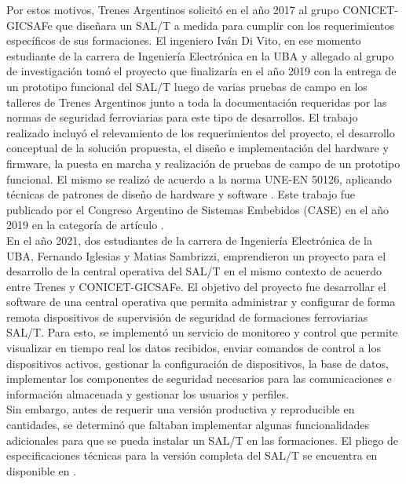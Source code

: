 Por estos motivos, Trenes Argentinos solicitó en el año 2017 al grupo CONICET-GICSAFe que diseñara un SAL/T a medida para cumplir con los requerimientos específicos de sus formaciones. El ingeniero Iván Di Vito, en ese momento estudiante de la carrera de Ingeniería Electrónica en la UBA y allegado al grupo de investigación tomó el proyecto que finalizaría en el año 2019 con la entrega de un prototipo funcional del SAL/T luego de varias pruebas de campo en los talleres de Trenes Argentinos junto a toda la documentación requeridas por las normas de seguridad ferroviarias para este tipo de desarrollos. El trabajo realizado incluyó el relevamiento de los requerimientos del proyecto, el desarrollo conceptual de la solución propuesta, el diseño e implementación del hardware y firmware, la puesta en marcha y realización de pruebas de campo de un prototipo funcional. El mismo se realizó de acuerdo a la norma UNE-EN 50126, aplicando técnicas de patrones de diseño de hardware y software \cite{patrones}. Este trabajo fue publicado por el Congreso Argentino de Sistemas Embebidos (CASE) en el año 2019 en la categoría de artículo \cite{salt_case}. \\

En el año 2021, dos estudiantes de la carrera de Ingeniería Electrónica de la UBA, Fernando Iglesias y Matias Sambrizzi, emprendieron un proyecto para el desarrollo de la central operativa del SAL/T en el mismo contexto  de acuerdo entre Trenes y CONICET-GICSAFe. El objetivo del proyecto fue desarrollar el software de una central operativa que permita administrar y configurar de forma remota dispositivos de supervisión de seguridad de formaciones ferroviarias SAL/T. Para esto, se implementó un servicio de monitoreo y control que permite visualizar en tiempo real los datos recibidos, enviar comandos de control a los dispositivos activos, gestionar la configuración de dispositivos, la base de datos, implementar los componentes de seguridad necesarios para las comunicaciones e información almacenada y gestionar los usuarios y perfiles. \\


Sin embargo, antes de requerir una versión productiva y reproducible en cantidades, se determinó que faltaban implementar algunas funcionalidades adicionales para que se pueda instalar un SAL/T en las formaciones. El pliego de especificaciones técnicas para la versión completa del SAL/T se encuentra en disponible en \cite{spec}. \\

